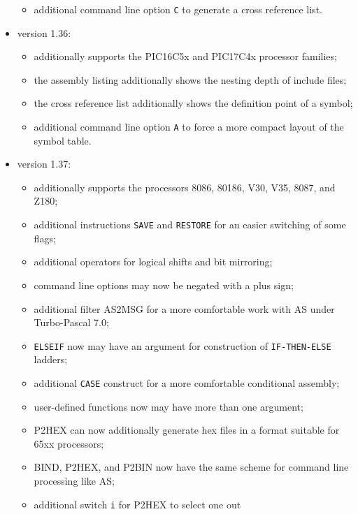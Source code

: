 \documentclass[12pt,twoside]{report}
\newcommand{\tty}[1]{{\tt #1}}
\newcommand{\asname}{{AS}}
\begin{document}
\begin{itemize}
{\begin{itemize}
{            usage of memory areas if the u option is enabled;}
      \item{additional command line option \tty{C} to generate a cross
            reference list.}
      \end{itemize}}
\item{version 1.36:
      \begin{itemize}
      \item{additionally supports the PIC16C5x and PIC17C4x
            processor families;}
      \item{the assembly listing additionally shows the nesting
            depth of include files;}
      \item{the cross reference list additionally shows the
            definition point of a symbol;}
      \item{additional command line option \tty{A} to force a more
            compact layout of the symbol table.}
      \end{itemize}}
\item{version 1.37:
      \begin{itemize}
      \item{additionally supports the processors 8086, 80186,
            V30, V35, 8087, and Z180;}
      \item{additional instructions \tty{SAVE} and \tty{RESTORE} for an
            easier switching of some flags;}
      \item{additional operators for logical shifts and bit
            mirroring;}
      \item{command line options may now be negated with a
            plus sign;}
      \item{additional filter AS2MSG for a more comfortable
            work with \asname{} under Turbo-Pascal 7.0;}
      \item{\tty{ELSEIF} now may have an argument for construction
            of \tty{IF\--THEN\--ELSE} ladders;}
      \item{additional \tty{CASE} construct for a more comfortable
            conditional assembly;}
      \item{user-defined functions now may have more than one
            argument;}
      \item{P2HEX can now additionally generate hex files in
            a format suitable for 65xx processors;}
      \item{BIND, P2HEX, and P2BIN now have the same scheme
            for command line processing like \asname{};}
      \item{additional switch \tty{i} for P2HEX to select one out
}
\end{itemize}}
\end{itemize}
\end{document}
